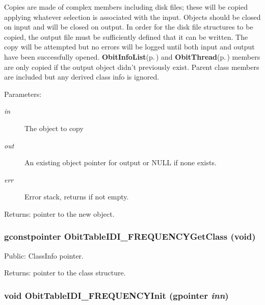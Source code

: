 Copies are made of complex members including disk files; these will be copied applying whatever selection is associated with the input. Objects should be closed on input and will be closed on output. In order for the disk file structures to be copied, the output file must be sufficiently defined that it can be written. The copy will be attempted but no errors will be logged until both input and output have been successfully opened. {\bf Obit\-Info\-List}{\rm (p.\,\pageref{structObitInfoList})} and {\bf Obit\-Thread}{\rm (p.\,\pageref{structObitThread})} members are only copied if the output object didn't previously exist. Parent class members are included but any derived class info is ignored. \begin{Desc}
\item[Parameters:]
\begin{description}
\item[{\em in}]The object to copy \item[{\em out}]An existing object pointer for output or NULL if none exists. \item[{\em err}]Error stack, returns if not empty. \end{description}
\end{Desc}
\begin{Desc}
\item[Returns:]pointer to the new object. \end{Desc}
\subsubsection{\setlength{\rightskip}{0pt plus 5cm}gconstpointer Obit\-Table\-IDI\_\-FREQUENCYGet\-Class (void)}\label{ObitTableIDI__FREQUENCY_8c_a17}


Public: Class\-Info pointer. 

\begin{Desc}
\item[Returns:]pointer to the class structure. \end{Desc}
\subsubsection{\setlength{\rightskip}{0pt plus 5cm}void Obit\-Table\-IDI\_\-FREQUENCYInit (gpointer {\em inn})}\label{ObitTableIDI__FREQUENCY_8c_a8}


